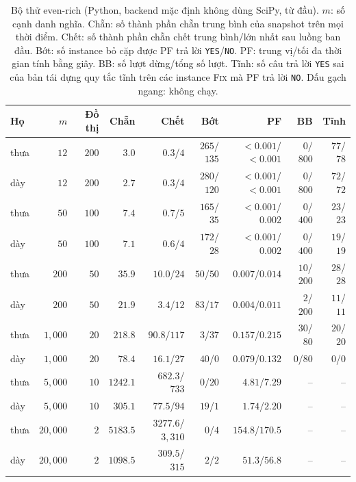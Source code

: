 \documentclass[pdflatex,sn-mathphys-num]{sn-jnl}
\theoremstyle{thmstyleone}
\theoremstyle{thmstyletwo}
\theoremstyle{thmstylethree}
\newcommand{\FIX}{\textup{\textsc{Fix}}}
\newcommand{\YES}{\texttt{YES}}
\newcommand{\NO}{\texttt{NO}}
\begin{document}
\begin{table}[!t]
\caption{Bộ thử even-rich (Python, backend mặc định không dùng SciPy, từ đầu). $m$: số cạnh danh nghĩa. Chẵn: số thành phần chẵn trung bình của snapshot trên mọi thời điểm. Chết: số thành phần chẵn chết trung bình/lớn nhất sau luồng ban đầu. Bớt: số instance bỏ cặp được PF trả lời \YES{}/\NO{}. PF: trung vị/tối đa thời gian tính bằng giây. BB: số lượt dừng/tổng số lượt. Tĩnh: số câu trả lời \YES{} sai của bản tái dựng quy tắc tĩnh trên các instance \FIX{} mà PF trả lời \NO{}. Dấu gạch ngang: không chạy.}
\label{tab:even}
\scriptsize
\setlength{\tabcolsep}{2.5pt}
\begin{tabular*}{\textwidth}{@{\extracolsep\fill}lrrrrrrrr}
\toprule
Họ & $m$ & Đồ thị & Chẵn & Chết & Bớt & PF & BB & Tĩnh \\
\midrule
thưa & $12$ & $200$ & $3.0$ & $0.3$/$4$ & $265$/$135$ & $<0.001$/$<0.001$ & $0$/$800$ & $77$/$78$ \\
dày & $12$ & $200$ & $2.7$ & $0.3$/$4$ & $280$/$120$ & $<0.001$/$<0.001$ & $0$/$800$ & $72$/$72$ \\
thưa & $50$ & $100$ & $7.4$ & $0.7$/$5$ & $165$/$35$ & $<0.001$/$0.002$ & $0$/$400$ & $23$/$23$ \\
dày & $50$ & $100$ & $7.1$ & $0.6$/$4$ & $172$/$28$ & $<0.001$/$0.002$ & $0$/$400$ & $19$/$19$ \\
thưa & $200$ & $50$ & $35.9$ & $10.0$/$24$ & $50$/$50$ & $0.007$/$0.014$ & $10$/$200$ & $28$/$28$ \\
dày & $200$ & $50$ & $21.9$ & $3.4$/$12$ & $83$/$17$ & $0.004$/$0.011$ & $2$/$200$ & $11$/$11$ \\
thưa & $1{,}000$ & $20$ & $218.8$ & $90.8$/$117$ & $3$/$37$ & $0.157$/$0.215$ & $30$/$80$ & $20$/$20$ \\
dày & $1{,}000$ & $20$ & $78.4$ & $16.1$/$27$ & $40$/$0$ & $0.079$/$0.132$ & $0$/$80$ & $0$/$0$ \\
thưa & $5{,}000$ & $10$ & $1242.1$ & $682.3$/$733$ & $0$/$20$ & $4.81$/$7.29$ & -- & -- \\
dày & $5{,}000$ & $10$ & $305.1$ & $77.5$/$94$ & $19$/$1$ & $1.74$/$2.20$ & -- & -- \\
thưa & $20{,}000$ & $2$ & $5183.5$ & $3277.6$/$3{,}310$ & $0$/$4$ & $154.8$/$170.5$ & -- & -- \\
dày & $20{,}000$ & $2$ & $1098.5$ & $309.5$/$315$ & $2$/$2$ & $51.3$/$56.8$ & -- & -- \\
\bottomrule
\end{tabular*}
\end{table}
\end{document}

